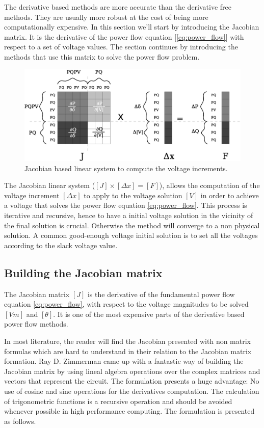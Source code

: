 \documentclass[nols,a4paper,twoside,symmetric,notoc,fleqn]{tufte-book}
\begin{document}
The derivative based methods are more accurate than the derivative free methods. They are usually more robust at the cost of being more computationally expensive. In this section we'll start by introducing the Jacobian matrix. It is the derivative of the power flow equation  [\ref{eq:power_flow}] with respect to a set of voltage values. The section continues by introducing the methods that use this matrix to solve the power flow problem.

\begin{center}
\begin{figure}[h!]
  \includegraphics[width=0.9\linewidth]{img/JacobianBased.eps}
  \caption{Jacobian based linear system to compute the voltage increments.}
  \label{fig:jacobian_based}
\end{figure}
\end{center}

The Jacobian linear system ($[J] \times [\Delta x] = [F]$), allows the computation of the voltage increment $[\Delta x]$ to apply to the voltage solution $[V]$ in order to achieve a voltage that solves the power flow equation \ref{eq:power_flow}. This process is iterative and recursive, hence to have a initial voltage solution in the vicinity of the final solution is crucial. Otherwise the method will converge to a non physical solution. A common good-enough voltage initial solution is to set all the voltages according to the slack voltage value.


\subsection{Building the Jacobian matrix} \label{Jacobian_chapter}

The Jacobian matrix $[J]$ is the derivative of the fundamental power flow equation \ref{eq:power_flow}, with respect to the voltage magnitudes to be solved $[Vm]$ and $[\theta]$. It is one of the most expensive parts of the derivative based power flow methods.

In most literature, the reader will find the Jacobian presented with non matrix formulas which are hard to understand in their relation to the Jacobian matrix formation. Ray D. Zimmerman came up with a fantastic way of building the Jacobian matrix \cite{zimmerman2010ac} by using lineal algebra operations over the complex matrices and vectors that represent the circuit. The formulation presents a huge advantage: No use of cosine and sine operations for the derivatives computation. The calculation of trigonometric functions is a recursive operation and should be avoided whenever possible in high performance computing. The formulation is presented as follows.
\end{document}
